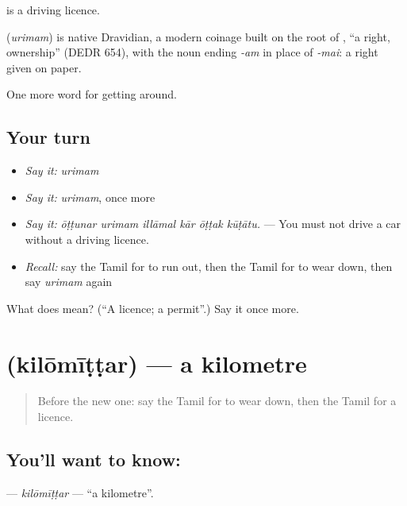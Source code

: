   is a driving licence.

\begin{cousinweb}
\textbf{} (\emph{urimam}) is native Dravidian, a modern coinage built on the root of , \textquotedblleft{}a right, ownership\textquotedblright{} (DEDR 654), with the noun ending \emph{-am} in place of \emph{-mai}: a right given on paper.
\end{cousinweb}

\begin{grammarlens}[title={What you've built}]
One more word for getting around.
\end{grammarlens}

\subsection*{Your turn}
\begin{itemize}
\raggedright
  \item \emph{Say it:} \emph{urimam}
  \item \emph{Say it:} \emph{urimam}, once more
  \item \emph{Say it:} \emph{ōṭṭunar urimam illāmal kār ōṭṭak kūṭātu.} — You must not drive a car without a driving licence.
  \item \emph{Recall:} say the Tamil for to run out, then the Tamil for to wear down, then say \emph{urimam} again
\end{itemize}

\begin{tcolorbox}[breakable,colback=teal!4,colframe=teal!35!black,title={Before you move on}]
What does  mean? (\textquotedblleft{}A licence; a permit\textquotedblright{}.) Say it once more.
\end{tcolorbox}
\section[\texorpdfstring{\ta{கிலோமீட்டர்} (kilōmīṭṭar)}{கிலோமீட்டர் (kilōmīṭṭar)}]{ (kilōmīṭṭar) — a kilometre}

\label{lesson:TA-C407-kilomittar}



\begin{quote}
Before the new one: say the Tamil for to wear down, then the Tamil for a licence.
\end{quote}

\subsection*{You'll want to know: }
\textbf{} — \emph{kilōmīṭṭar} — \textquotedblleft{}a kilometre\textquotedblright{}.

